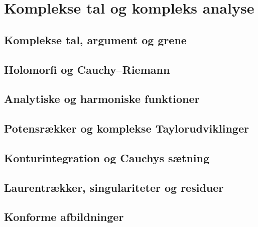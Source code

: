 \chapter{Komplekse tal og kompleks analyse}
\section{Komplekse tal, argument og grene}
\leavevmode\par

\section{Holomorfi og Cauchy–Riemann}
\leavevmode\par

\section{Analytiske og harmoniske funktioner}
\leavevmode\par

\section{Potensrækker og komplekse Taylorudviklinger}
\leavevmode\par

\section{Konturintegration og Cauchys sætning}
\leavevmode\par

\section{Laurentrækker, singulariteter og residuer}
\leavevmode\par

\section{Konforme afbildninger}
\leavevmode\par

